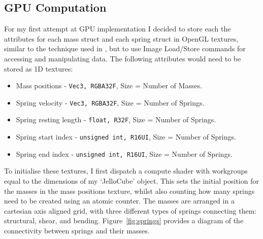 \documentclass[]{acmsiggraph}
\begin{document}
\subsection{GPU Computation}

For my first attempt at GPU implementation I decided to store each the attributes for each mass struct and each spring struct in OpenGL textures, similar to the technique used in \cite{massSpringGPU}, but to use Image Load/Store commands for accessing and manipulating data. The following attributes would need to be stored as 1D textures:

\begin{itemize}
	\item Mass positions - \lstinline{Vec3, RGBA32F}, Size = Number of Masses.
	\item Spring velocity - \lstinline{Vec3, RGBA32F}, Size = Number of Springs.
	\item Spring resting length - \lstinline{float, R32F}, Size = Number of Springs.
	\item Spring start index - \lstinline{unsigned int, R16UI}, Size = Number of Springs.
	\item Spring end index - \lstinline{unsigned int, R16UI}, Size = Number of Springs.
\end{itemize}

To initialise these textures, I first dispatch a compute shader with workgroups equal to the dimensions of my ‘JelloCube’ object. This sets the initial position for the masses in the mass positions texture, whilst also counting how many springs need to be created using an atomic counter. The masses are arranged in a cartesian axis aligned grid, with three different types of springs connecting them: structural, shear, and bending. Figure~\ref{fig:springs} provides a diagram of the connectivity between springs and their masses.
\end{document}
